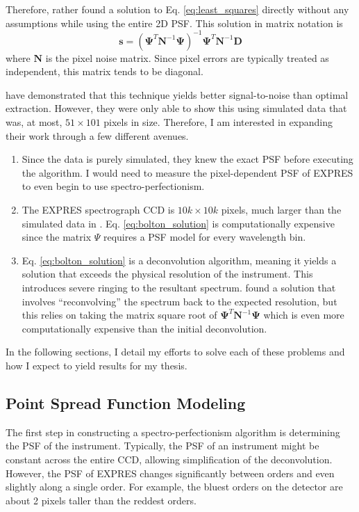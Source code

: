 \documentclass[11pt]{article}
\begin{document}
Therefore, \citet{Bolton2009} rather found a solution to Eq. \ref{eq:least_squares} directly without any assumptions while using the entire 2D PSF. This solution in matrix notation is
\begin{equation}
    \textbf{s} = (\bm{\Psi}^T \bm{N}^{-1} \bm{\Psi})^{-1} \bm{\Psi}^T \bm{N}^{-1} \bm{D}
    \label{eq:bolton_solution}
\end{equation}
where $\bm{N}$ is the pixel noise matrix. Since pixel errors are typically treated as independent, this matrix tends to be diagonal.

\citet{Bolton2009} have demonstrated that this technique yields better signal-to-noise than optimal extraction. However, they were only able to show this using simulated data that was, at most, $51\times101$ pixels in size. Therefore, I am interested in expanding their work through a few different avenues.
\begin{enumerate}
    \item Since the \citet{Bolton2009} data is purely simulated, they knew the exact PSF before executing the algorithm. I would need to measure the pixel-dependent PSF of EXPRES to even begin to use spectro-perfectionism.
    \item The EXPRES spectrograph CCD is $10k \times 10k$ pixels, much larger than the simulated data in \citet{Bolton2009}. Eq. \ref{eq:bolton_solution} is computationally expensive since the matrix $\Psi$ requires a PSF model for every wavelength bin.
    \item Eq. \ref{eq:bolton_solution} is a deconvolution algorithm, meaning it yields a solution that exceeds the physical resolution of the instrument. This introduces severe ringing to the resultant spectrum. \citet{Bolton2009} found a solution that involves ``reconvolving'' the spectrum back to the expected resolution, but this relies on taking the matrix square root of $\bm{\Psi}^T \bm{N}^{-1} \bm{\Psi}$ which is even more computationally expensive than the initial deconvolution.
\end{enumerate}
In the following sections, I detail my efforts to solve each of these problems and how I expect to yield results for my thesis.

\subsection{Point Spread Function Modeling}
\label{subsec:psf}

The first step in constructing a spectro-perfectionism algorithm is determining the PSF of the instrument. Typically, the PSF of an instrument might be constant across the entire CCD, allowing simplification of the deconvolution. However, the PSF of EXPRES changes significantly between orders and even slightly along a single order. For example, the bluest orders on the detector are about 2 pixels taller than the reddest orders.
\end{document}
